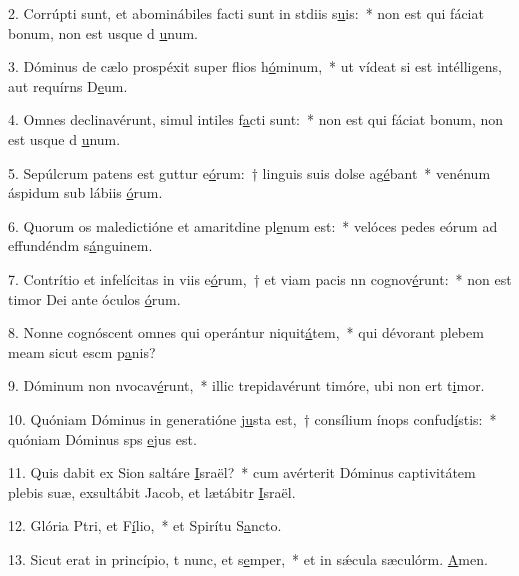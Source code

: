 2. Corrúpti sunt, et abominábiles facti sunt in stdiis s\uline{u}is:~* non est qui fáciat bonum, non est usque d \uline{u}num.\par 
3. Dóminus de cælo prospéxit super flios h\uline{ó}minum,~* ut vídeat si est intélligens, aut requírns D\uline{e}um.\par 
4. Omnes declinavérunt, simul intiles f\uline{a}cti sunt:~* non est qui fáciat bonum, non est usque d \uline{u}num.\par 
5. Sepúlcrum patens est guttur e\uline{ó}rum:~† linguis suis dolse ag\uline{é}bant~* venénum áspidum sub lábiis \uline{ó}rum.\par 
6. Quorum os maledictióne et amaritdine pl\uline{e}num est:~* velóces pedes eórum ad effundéndm s\uline{á}nguinem.\par 
7. Contrítio et infelícitas in viis e\uline{ó}rum,~† et viam pacis nn cognov\uline{é}runt:~* non est timor Dei ante óculos \uline{ó}rum.\par 
8. Nonne cognóscent omnes qui operántur niquit\uline{á}tem,~* qui dévorant plebem meam sicut escm p\uline{a}nis?\par 
9. Dóminum non nvocav\uline{é}runt,~* illic trepidavérunt timóre, ubi non ert t\uline{i}mor.\par 
10. Quóniam Dóminus in generatióne \uline{ju}sta est,~† consílium ínops confud\uline{í}stis:~* quóniam Dóminus sps \uline{e}jus est.\par 
11. Quis dabit ex Sion saltáre \uline{I}sraël?~* cum avérterit Dóminus captivitátem plebis suæ, exsultábit Jacob, et lætábitr \uline{I}sraël.\par 
12. Glória Ptri, et F\uline{í}lio,~* et Spirítu S\uline{a}ncto.\par 
13. Sicut erat in princípio, t nunc, et s\uline{e}mper,~* et in sǽcula sæculórm. \uline{A}men.\par 
